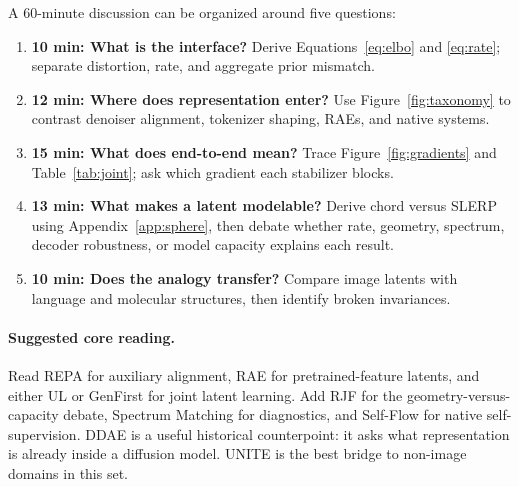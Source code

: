 \documentclass{article}
\begin{document}
A 60-minute discussion can be organized around five questions:
\begin{enumerate}[leftmargin=*]
  \item \textbf{10 min: What is the interface?} Derive Equations~\eqref{eq:elbo} and \eqref{eq:rate}; separate distortion, rate, and aggregate prior mismatch.
  \item \textbf{12 min: Where does representation enter?} Use Figure~\ref{fig:taxonomy} to contrast denoiser alignment, tokenizer shaping, RAEs, and native systems.
  \item \textbf{15 min: What does end-to-end mean?} Trace Figure~\ref{fig:gradients} and Table~\ref{tab:joint}; ask which gradient each stabilizer blocks.
  \item \textbf{13 min: What makes a latent modelable?} Derive chord versus SLERP using Appendix~\ref{app:sphere}, then debate whether rate, geometry, spectrum, decoder robustness, or model capacity explains each result.
  \item \textbf{10 min: Does the analogy transfer?} Compare image latents with language and molecular structures, then identify broken invariances.
\end{enumerate}

\paragraph{Suggested core reading.}
Read REPA \citep{yu2024repa} for auxiliary alignment, RAE \citep{zheng2025rae} for pretrained-feature latents, and either UL \citep{heek2026ul} or GenFirst \citep{zheng2026genfirst} for joint latent learning. Add RJF \citep{kumar2026rjf} for the geometry-versus-capacity debate, Spectrum Matching \citep{ning2026spectrum} for diagnostics, and Self-Flow \citep{chefer2026selfflow} for native self-supervision. DDAE \citep{xiang2023ddae} is a useful historical counterpoint: it asks what representation is already inside a diffusion model. UNITE \citep{duggal2026unite} is the best bridge to non-image domains in this set.
\end{document}
